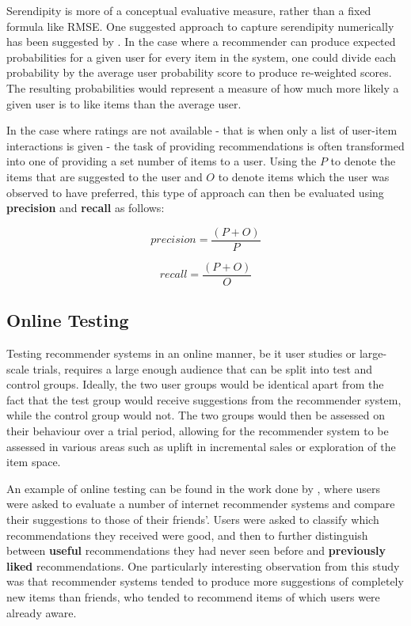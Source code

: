 Serendipity is more of a conceptual evaluative measure, rather than a fixed formula like RMSE. One suggested approach to capture serendipity numerically has been suggested by \parencite{eval_colab}. In the case where a recommender can produce expected probabilities for a given user for every item in the system, one could divide each probability by the average user probability score to produce re-weighted scores. The resulting probabilities would represent a measure of how much more likely a given user is to like items than the average user.

In the case where ratings are not available - that is when only a list of user-item interactions is given - the task of providing recommendations is often transformed into one of providing a set number of items to a user. Using the $P$ to denote the items that are suggested to the user and $O$ to denote items which the user was observed to have preferred, this type of approach can then be evaluated using \textbf{precision} and \textbf{recall} as follows: \parencite{handbook_1.4_neighbourhood}

\begin{equation}
    precision = \dfrac{(P + O)}{P}
\end{equation}

\begin{equation}
    recall = \dfrac{(P + O)}{O}
\end{equation}

\subsection{Online Testing}
Testing recommender systems in an online manner, be it user studies or large-scale trials, requires a large enough audience that can be split into test and control groups. Ideally, the two user groups would be identical apart from the fact that the test group would receive suggestions from the recommender system, while the control group would not. The two groups would then be assessed on their behaviour over a trial period, allowing for the recommender system to be assessed in various areas such as uplift in incremental sales or exploration of the item space. \parencite{online_predicting}

An example of online testing can be found in the work done by \cite{swearingen2001beyondalgorithms}, where users were asked to evaluate a number of internet recommender systems and compare their suggestions to those of their friends'. Users were asked to classify which recommendations they received were good, and then to further distinguish between \textbf{useful} recommendations they had never seen before and \textbf{previously liked} recommendations. One particularly interesting observation from this study was that recommender systems tended to produce more suggestions of completely new items than friends, who tended to recommend items of which users were already aware.

